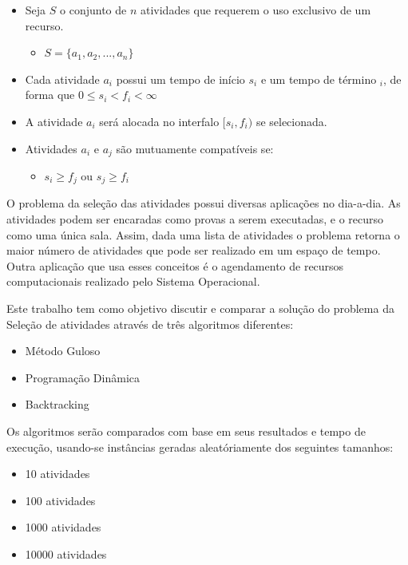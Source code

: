 \documentclass[12pt]{article}
\begin{document}
\begin{itemize}
\item Seja $S$ o conjunto de $n$ atividades que requerem o uso exclusivo de um recurso.
	\begin{itemize}
		\item $S = \{ a_{1}, a_{2}, ..., a_{n} \} $
	\end{itemize}
\item Cada atividade $a_{i}$ possui um tempo de início $s_{i}$ e um tempo de término $_{i}$, de forma que $0 \leq s_{i} < f_{i} < \infty $

\item A atividade $a_{i}$ será alocada no interfalo $ [ s_{i}, f_{i} ) $ se selecionada. 
\item Atividades $a_{i}$ e $a_{j}$ são mutuamente compatíveis se:
	\begin{itemize}
		\item $s_{i} \geq f_{j}$ ou $s_{j} \geq f_{i} $
	\end{itemize}
\end{itemize}

O problema da seleção das atividades possui diversas aplicações no dia-a-dia. As atividades podem ser encaradas como provas a serem executadas, e o recurso como uma única sala. Assim, dada uma lista de atividades o problema retorna o maior número de atividades que pode ser realizado em um espaço de tempo. Outra aplicação que usa esses conceitos é o agendamento de recursos computacionais realizado pelo Sistema Operacional.



Este trabalho tem como objetivo discutir e comparar a solução do problema da Seleção de atividades através de três algoritmos diferentes:
\begin{itemize}
\item Método Guloso
\item Programação Dinâmica
\item Backtracking
\end{itemize}

Os algoritmos serão comparados com base em seus resultados e tempo de execução, usando-se instâncias geradas aleatóriamente dos seguintes tamanhos:
\begin{itemize}
\item 10 atividades
\item 100 atividades
\item 1000 atividades
\item 10000 atividades
\end{itemize}
\end{document}
